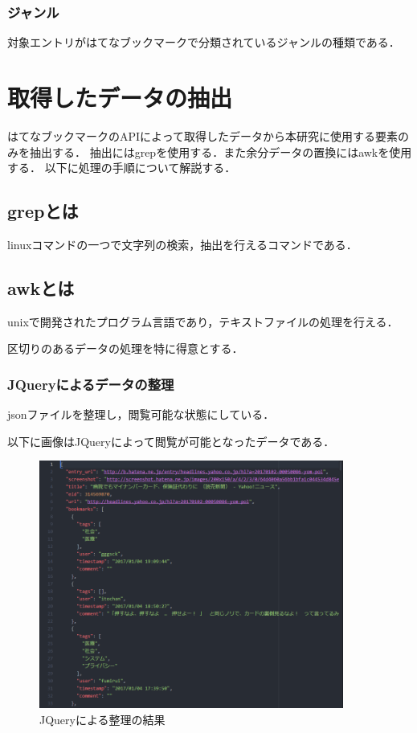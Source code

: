 \subsubsection{ジャンル}
対象エントリがはてなブックマークで分類されているジャンルの種類である．

\newpage

\section{取得したデータの抽出}
はてなブックマークのAPIによって取得したデータから本研究に使用する要素のみを抽出する．
抽出にはgrepを使用する．また余分データの置換にはawkを使用する．
以下に処理の手順について解説する．

\subsection{grepとは}
linuxコマンドの一つで文字列の検索，抽出を行えるコマンドである．

\subsection{awkとは}
unixで開発されたプログラム言語であり，テキストファイルの処理を行える．\par
区切りのあるデータの処理を特に得意とする．

\subsubsection{JQueryによるデータの整理}
jsonファイルを整理し，閲覧可能な状態にしている．\par
以下に画像はJQueryによって閲覧が可能となったデータである．
\begin{figure}[htb]
\centering
\includegraphics[width=10cm]{jq.PNG}
\caption{JQueryによる整理の結果}\label{jq}
\end{figure}

